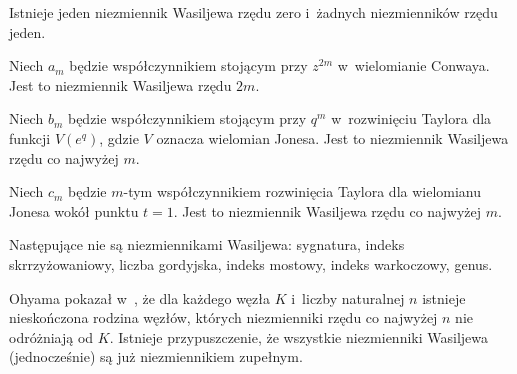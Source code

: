 Istnieje jeden niezmiennik Wasiljewa rzędu zero i~żadnych niezmienników rzędu jeden.

\begin{example}
    Niech $a_m$ będzie współczynnikiem stojącym przy $z^{2m}$ w~wielomianie Conwaya.
    Jest to niezmiennik Wasiljewa rzędu $2m$.
\end{example}

\begin{example}
    Niech $b_m$ będzie współczynnikiem stojącym przy $q^m$ w~rozwinięciu Taylora dla funkcji $V(e^q)$, gdzie $V$ oznacza wielomian Jonesa.
    Jest to niezmiennik Wasiljewa rzędu co najwyżej $m$.
\end{example}

\begin{example}
    Niech $c_m$ będzie $m$-tym współczynnikiem rozwinięcia Taylora dla wielomianu Jonesa wokół punktu $t = 1$.
    Jest to niezmiennik Wasiljewa rzędu co najwyżej $m$.
\end{example}


Następujące nie są niezmiennikami Wasiljewa: sygnatura, indeks skrrzyżowaniowy, liczba gordyjska, indeks mostowy, indeks warkoczowy, genus.


Ohyama pokazał w~\cite{ohyama95}, że dla każdego węzła $K$ i~liczby naturalnej $n$ istnieje nieskończona rodzina węzłów, których niezmienniki rzędu co najwyżej $n$ nie odróżniają od $K$.
Istnieje przypuszczenie, że wszystkie niezmienniki Wasiljewa (jednocześnie) są już niezmiennikiem zupełnym.